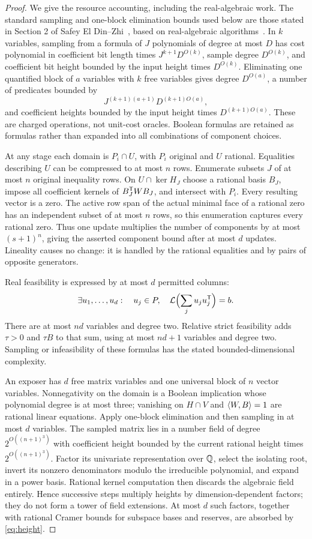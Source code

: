 \begin{proof}
We give the resource accounting, including the real-algebraic work. The standard sampling and one-block elimination bounds used below are those stated in Section 2 of Safey El Din--Zhi~\cite{SEDZ}, based on real-algebraic algorithms~\cite{BPR}. In $k$ variables, sampling from a formula of $J$ polynomials of degree at most $D$ has cost polynomial in coefficient bit length times $J^{k+1}D^{O(k)}$, sample degree $D^{O(k)}$, and coefficient bit height bounded by the input height times $D^{O(k)}$. Eliminating one quantified block of $a$ variables with $k$ free variables gives degree $D^{O(a)}$, a number of predicates bounded by
\[
 J^{(k+1)(a+1)}D^{(k+1)O(a)},
\]
and coefficient heights bounded by the input height times $D^{(k+1)O(a)}$. These are charged operations, not unit-cost oracles. Boolean formulas are retained as formulas rather than expanded into all combinations of component choices.

At any stage each domain is $P_i\cap U$, with $P_i$ original and $U$ rational. Equalities describing $U$ can be compressed to at most $n$ rows. Enumerate subsets $J$ of at most $n$ original inequality rows. On $U\cap\ker H_J$ choose a rational basis $B_J$, impose all coefficient kernels of $B_J^{\mathsf T} WB_J$, and intersect with $P_i$. Every resulting vector is a zero. The active row span of the actual minimal face of a rational zero has an independent subset of at most $n$ rows, so this enumeration captures every rational zero. Thus one update multiplies the number of components by at most $(s+1)^n$, giving the asserted component bound after at most $d$ updates. Lineality causes no change: it is handled by the rational equalities and by pairs of opposite generators.

Real feasibility is expressed by at most $d$ permitted columns:
\[
 \exists u_1,\ldots,u_d:\quad u_j\in P,\quad
 \mathcal L\Bigl(\sum_ju_ju_j^{\mathsf T}\Bigr)=b.
\]
There are at most $nd$ variables and degree two. Relative strict feasibility adds $\tau>0$ and $\tau B$ to that sum, using at most $nd+1$ variables and degree two. Sampling or infeasibility of these formulas has the stated bounded-dimensional complexity.

An exposer has $d$ free matrix variables and one universal block of $n$ vector variables. Nonnegativity on the domain is a Boolean implication whose polynomial degree is at most three; vanishing on $H\cap V$ and $\langle W,B\rangle=1$ are rational linear equations. Apply one-block elimination and then sampling in at most $d$ variables. The sampled matrix lies in a number field of degree $2^{O((n+1)^3)}$ with coefficient height bounded by the current rational height times $2^{O((n+1)^3)}$. Factor its univariate representation over $\mathbb Q$, select the isolating root, invert its nonzero denominators modulo the irreducible polynomial, and expand in a power basis. Rational kernel computation then discards the algebraic field entirely. Hence successive steps multiply heights by dimension-dependent factors; they do not form a tower of field extensions. At most $d$ such factors, together with rational Cramer bounds for subspace bases and reserves, are absorbed by \eqref{eq:height}.


\end{proof}
